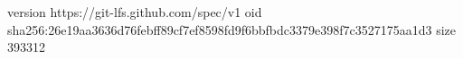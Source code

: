 version https://git-lfs.github.com/spec/v1
oid sha256:26e19aa3636d76febff89cf7ef8598fd9f6bbfbdc3379e398f7c3527175aa1d3
size 393312
